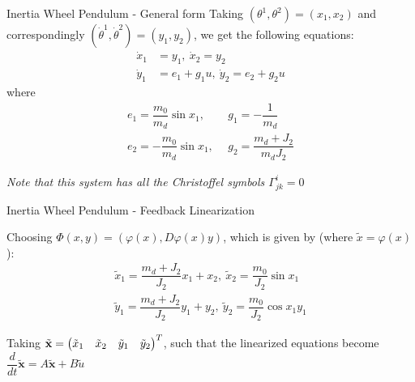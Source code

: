 \documentclass{beamer}
\begin{document}
\begin{frame}{Inertia Wheel Pendulum - General form}
  Taking $(\theta^1, \theta^2) = (x_1, x_2)$ and correspondingly $(\dot{\theta}^1, \dot{\theta}^2) = (y_1, y_2)$, we get the following equations:
  \begin{equation}
  \begin{split}
      \dot{x}_1  & = y_1, \
      \dot{x}_2  = y_2 \\
      \dot{y}_1  & = e_1 + g_1 u, \
      \dot{y}_2  = e_2 + g_2 u
  \end{split}
  \end{equation}
  where 
  \begin{equation*}
      \begin{split}
          e_1 = \dfrac{m_0}{m_d}\sin{x_1}, & \ \ g_1 = -\dfrac{1}{m_d} \\
          e_2 = -\dfrac{m_0}{m_d} \sin{x_1}, & \ \ g_2 = \dfrac{m_d + J_2}{m_d J_2}
      \end{split}
  \end{equation*}

  
  \textsl{Note that this system has all the Christoffel symbols $\Gamma^i_{jk} = 0$}

  
\end{frame}

\begin{frame}{Inertia Wheel Pendulum - Feedback Linearization}

  Choosing $\Phi(x,y) = \left( \varphi(x), D\varphi(x)y\right)$, which is given by (where $\tilde{x} = \varphi(x)$):
\begin{equation}
\begin{split}
        \tilde{x}_1  = \dfrac{m_d+J_2}{J_2}x_1 + x_2, \ 
        \tilde{x}_2  = \dfrac{m_0}{J_2}\sin{x_1} \\
        \tilde{y}_1  = \dfrac{m_d+J_2}{J_2}y_1 + y_2,\
        \tilde{y}_2  = \dfrac{m_0}{J_2}\cos{x_1}y_1
\end{split}
\end{equation}

Taking $\tilde{\textbf{x}} = \begin{pmatrix}\tilde{x}_1 & \tilde{x}_2 & \tilde{y}_1 & \tilde{y}_2 \end{pmatrix}^T$, such that the linearized equations become $\dfrac{d}{dt} \tilde{\textbf{x}} = A \tilde{\textbf{x}} + B \tilde{u}$
\end{frame}
\end{document}

